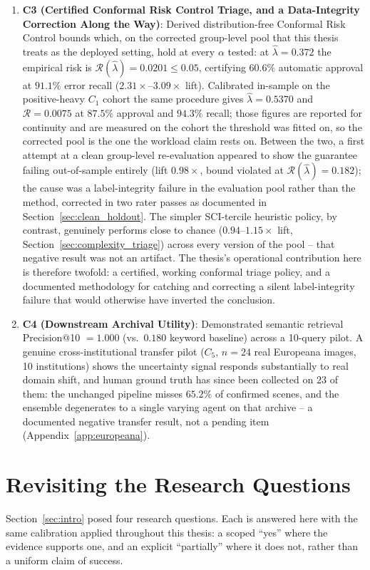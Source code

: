\documentclass[12pt,a4paper]{report}
\begin{document}
\begin{enumerate}
    \item \textbf{C3 (Certified Conformal Risk Control Triage, and a Data-Integrity Correction Along the Way)}: Derived distribution-free Conformal Risk Control bounds which, on the corrected group-level pool that this thesis treats as the deployed setting, hold at every $\alpha$ tested: at $\hat{\lambda}=0.372$ the empirical risk is $\mathcal{R}(\hat{\lambda})=0.0201 \le 0.05$, certifying $60.6\%$ automatic approval at $91.1\%$ error recall ($2.31\times$--$3.09\times$ lift). Calibrated in-sample on the positive-heavy $C_1$ cohort the same procedure gives $\hat{\lambda}=0.5370$ and $\mathcal{R}=0.0075$ at $87.5\%$ approval and $94.3\%$ recall; those figures are reported for continuity and are measured on the cohort the threshold was fitted on, so the corrected pool is the one the workload claim rests on. Between the two, a first attempt at a clean group-level re-evaluation appeared to show the guarantee failing out-of-sample entirely (lift $0.98\times$, bound violated at $\mathcal{R}(\hat\lambda)=0.182$); the cause was a label-integrity failure in the evaluation pool rather than the method, corrected in two rater passes as documented in Section~\ref{sec:clean_holdout}. The simpler SCI-tercile heuristic policy, by contrast, genuinely performs close to chance ($0.94$--$1.15\times$ lift, Section~\ref{sec:complexity_triage}) across every version of the pool -- that negative result was not an artifact. The thesis's operational contribution here is therefore twofold: a certified, working conformal triage policy, and a documented methodology for catching and correcting a silent label-integrity failure that would otherwise have inverted the conclusion.
    \item \textbf{C4 (Downstream Archival Utility)}: Demonstrated semantic retrieval Precision@10 $=1.000$ (vs.\ $0.180$ keyword baseline) across a 10-query pilot. A genuine cross-institutional transfer pilot ($C_5$, $n=24$ real Europeana images, 10 institutions) shows the uncertainty signal responds substantially to real domain shift, and human ground truth has since been collected on $23$ of them: the unchanged pipeline misses $65.2\%$ of confirmed scenes, and the ensemble degenerates to a single varying agent on that archive -- a documented negative transfer result, not a pending item (Appendix~\ref{app:europeana}).
\end{enumerate}

\section{Revisiting the Research Questions}
Section~\ref{sec:intro} posed four research questions. Each is answered here with the same calibration applied throughout this thesis: a scoped ``yes'' where the evidence supports one, and an explicit ``partially'' where it does not, rather than a uniform claim of success.
\end{document}
